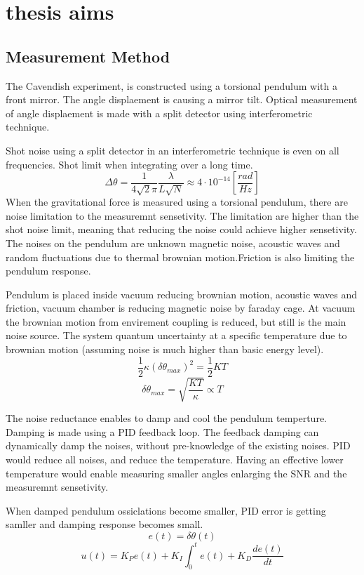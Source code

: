 \documentclass[\main/master.tex]{subfiles}
\begin{document}
\chapter{thesis aims}\label{chp:example-2}
\section{Measurement Method}
The Cavendish experiment, is constructed using a torsional pendulum with a front mirror. The angle displaement is causing a mirror tilt. Optical measurement of angle displaement is made with a split detector using interferometric technique. 
\par
Shot noise using a split detector in an interferometric technique is even on all frequencies. Shot limit when integrating over a long time.
\begin{equation}
\Delta\theta = \frac{1}{4\sqrt{2}\pi}\frac{\lambda}{L\sqrt{N}} \approx
4\cdot10^{-14} [\frac{rad}{Hz}]    \label{eqn:gravitation_tourqe}
\end{equation}
When the gravitational force is measured using a torsional pendulum, there are noise limitation to the measuremnt sensetivity. The limitation are higher than the shot noise limit, meaning that reducing the noise could achieve higher sensetivity. The noises on the pendulum are unknown magnetic noise, acoustic waves and random fluctuations due to thermal brownian motion.Friction is also limiting the pendulum response. 
\par
Pendulum is placed inside vacuum reducing brownian motion, acoustic waves and friction, vacuum chamber is reducing magnetic noise by faraday cage. At vacuum the brownian motion from envirement coupling is reduced, but still is the main noise source. The system quantum uncertainty at a specific temperature due to brownian motion (assuming noise is much higher than basic energy level). 
\begin{equation}
\frac{1}{2}\kappa (\delta\theta_{max})^2= \frac{1}{2}KT  \label{eqn:radiation force}
\end{equation}
\begin{equation}
\delta\theta_{max} = \sqrt{\frac{KT}{\kappa}}\propto{T}  \label{eqn:radiation force}
\end{equation}

The noise reductance enables to damp and cool the pendulum temperture. Damping is made using a PID feedback loop. The feedback damping can dynamically damp the noises, without pre-knowledge of the existing noises. PID would reduce all noises, and reduce the temperature. Having an effective lower temperature would enable measuring smaller angles enlarging the SNR and the measuremnt sensetivity.
\par
When damped pendulum ossiclations become smaller, PID error is getting samller and damping response becomes small. 
\begin{equation}
e(t) = \delta\theta(t)   \label{eqn:pid_error}
\end{equation}
\begin{equation}
u(t) = K_Pe(t)+K_I\int_{0}^{t}e(t)+K_D\frac{de(t)}{dt}   \label{eqn:PID_eq}
\end{equation}
\end{document}
